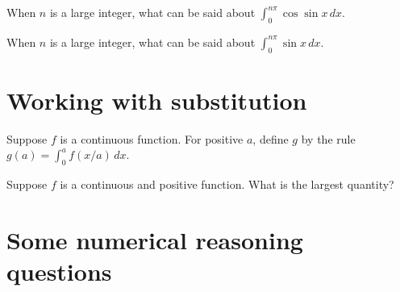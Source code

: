 \documentclass{ximera}
\begin{document}
\begin{problem}
  When $n$ is a large integer, what can be said about $\int_0^{n \pi} \cos \sin x \, dx$.
  \begin{multipleChoice}
  \end{multipleChoice}
\end{problem}

\begin{problem}
  When $n$ is a large integer, what can be said about $\int_0^{n \pi} \sin x \, dx$.
  \begin{multipleChoice}
  \end{multipleChoice}
\end{problem}

\clearpage

\section{Working with substitution}

\begin{problem}
  Suppose $f$ is a continuous function.  For positive $a$, define $g$ by the rule $g(a) = \int_0^a f(x/a) \, dx$.
  \begin{multipleChoice}
  \end{multipleChoice}
\end{problem}

\begin{problem}
  Suppose $f$ is a continuous and positive function.  What is the largest quantity?
  \begin{multipleChoice}
  \end{multipleChoice}
\end{problem}


\section{Some numerical reasoning questions}
\end{document}
